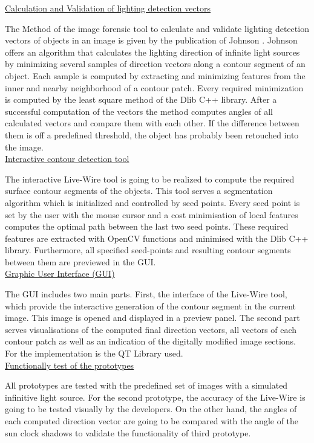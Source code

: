\underline{Calculation and Validation of lighting detection vectors }

The Method of the image forensic tool to calculate and validate lighting detection vectors of objects in an image is given by the publication of Johnson \cite{Johnson}. Johnson offers an algorithm that calculates the lighting direction of infinite light sources by minimizing several samples of direction vectors along a contour segment of an object. Each sample is computed by extracting and minimizing features from the inner and nearby neighborhood of a contour patch. Every required minimization is computed by the least square method of the Dlib C++ library.
After a successful computation of the vectors the method computes angles of all calculated vectors and compare them with each other. If the difference between them is off a predefined threshold, the object has probably been retouched into the image. \\


\underline{Interactive contour detection tool} 

The interactive Live-Wire tool \cite{BARRETT1997331} is going to be realized to compute the required surface contour segments of the objects. This tool serves a segmentation algorithm which is initialized and controlled by seed points. Every seed point is set by the user with the mouse cursor and a cost minimisation of local features computes the optimal path between the last two seed points. These required features are extracted with OpenCV functions and minimised with the Dlib C++ library. Furthermore, all specified seed-points and resulting contour segments between them are previewed in the GUI. \\


\underline{Graphic User Interface (GUI)} 

The GUI includes two main parts. First, the interface of the Live-Wire tool, which provide the interactive generation of the contour segment in the current image. This image is opened and displayed in a preview panel. The second part serves visualisations of the computed final direction vectors, all vectors of each contour patch as well as an indication of the digitally modified image sections. For the implementation is the QT Library used. \\ 


\underline{Functionally test of the prototypes} 

All prototypes are tested with the predefined set of images with a simulated infinitive light source. For the second prototype, the accuracy of the Live-Wire is going to be tested visually by the developers. On the other hand, the angles of each computed direction vector are going to be compared with the angle of the sun clock shadows to validate the functionality of  third prototype. \\ 


